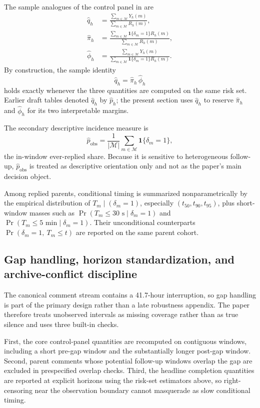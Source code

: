 The sample analogues of the control panel in  are
\begin{align}
\widehat q_h
&=
\frac{\sum_{m\in\mathcal{M}} Y_h(m)}
     {\sum_{m\in\mathcal{M}} R_h(m)},
\\
\widehat \pi_h
&=
\frac{\sum_{m\in\mathcal{M}} \mathbf{1}\{\delta_m=1\}R_h(m)}
     {\sum_{m\in\mathcal{M}} R_h(m)},
\\
\widehat \phi_h
&=
\frac{\sum_{m\in\mathcal{M}} Y_h(m)}
     {\sum_{m\in\mathcal{M}} \mathbf{1}\{\delta_m=1\}R_h(m)}.
\end{align}
By construction, the sample identity
\[
\widehat q_h=\widehat \pi_h\,\widehat \phi_h
\]
holds exactly whenever the three quantities are computed on the same risk set.
Earlier draft tables denoted \(\widehat q_h\) by \(\widehat p_h\); the present
section uses \(\widehat q_h\) to reserve \(\widehat \pi_h\) and
\(\widehat \phi_h\) for its two interpretable margins.

The secondary descriptive incidence measure is
\[
\widehat p_{\mathrm{obs}}
=
\frac{1}{|\mathcal{M}|}\sum_{m\in\mathcal{M}} \mathbf{1}\{\delta_m=1\},
\]
the in-window ever-replied share. Because it is sensitive to heterogeneous
follow-up, \(\widehat p_{\mathrm{obs}}\) is treated as descriptive orientation
only and not as the paper's main decision object.

Among replied parents, conditional timing is summarized nonparametrically by the
empirical distribution of \(T_m\mid (\delta_m=1)\), especially
\((t_{50},t_{90},t_{95})\), plus short-window masses such as
\(\Pr(T_m\le 30\text{ s}\mid \delta_m=1)\) and
\(\Pr(T_m\le 5\text{ min}\mid \delta_m=1)\). Their unconditional counterparts
\(\Pr(\delta_m=1,\ T_m\le t)\) are reported on the same parent cohort.

\subsection{Gap handling, horizon standardization, and archive-conflict discipline}
\label{sec:methods:gap-discipline}

The canonical comment stream contains a 41.7-hour interruption, so gap handling
is part of the primary design rather than a late robustness appendix. The paper
therefore treats unobserved intervals as missing coverage rather than as true
silence and uses three built-in checks.

First, the core control-panel quantities are recomputed on contiguous windows,
including a short pre-gap window and the substantially longer post-gap window.
Second, parent comments whose potential follow-up windows overlap the gap are
excluded in prespecified overlap checks. Third, the headline completion
quantities are reported at explicit horizons using the risk-set estimators above,
so right-censoring near the observation boundary cannot masquerade as slow
conditional timing.


